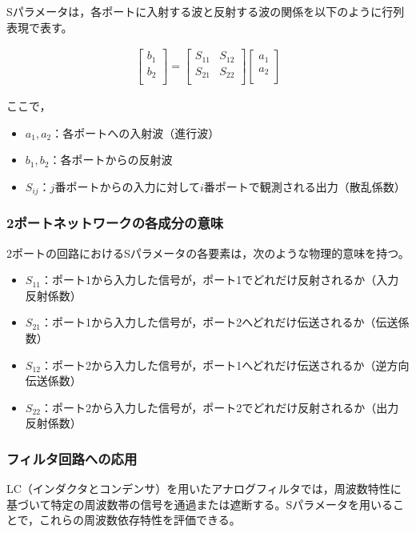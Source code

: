 \documentclass[11pt,dvipdfmx]{jarticle}
\begin{document}
Sパラメータは，各ポートに入射する波と反射する波の関係を以下のように行列表現で表す。

\begin{eqnarray}
\begin{bmatrix}
b_1 \\
b_2 \\
\end{bmatrix}
=
\begin{bmatrix}
S_{11} & S_{12} \\
S_{21} & S_{22} \\
\end{bmatrix}
\begin{bmatrix}
a_1 \\
a_2 \\
\end{bmatrix}
\end{eqnarray}

ここで，
\begin{itemize}
  \item $a_1, a_2$：各ポートへの入射波（進行波）
  \item $b_1, b_2$：各ポートからの反射波
  \item $S_{ij}$：$j$番ポートからの入力に対して$i$番ポートで観測される出力（散乱係数）
\end{itemize}

\subsubsection{2ポートネットワークの各成分の意味}
2ポートの回路におけるSパラメータの各要素は，次のような物理的意味を持つ。

\begin{itemize}
  \item $S_{11}$：ポート1から入力した信号が，ポート1でどれだけ反射されるか（入力反射係数）
  \item $S_{21}$：ポート1から入力した信号が，ポート2へどれだけ伝送されるか（伝送係数）
  \item $S_{12}$：ポート2から入力した信号が，ポート1へどれだけ伝送されるか（逆方向伝送係数）
  \item $S_{22}$：ポート2から入力した信号が，ポート2でどれだけ反射されるか（出力反射係数）
\end{itemize}

\subsubsection{フィルタ回路への応用}
LC（インダクタとコンデンサ）を用いたアナログフィルタでは，周波数特性に基づいて特定の周波数帯の信号を通過または遮断する。Sパラメータを用いることで，これらの周波数依存特性を評価できる。
\end{document}
